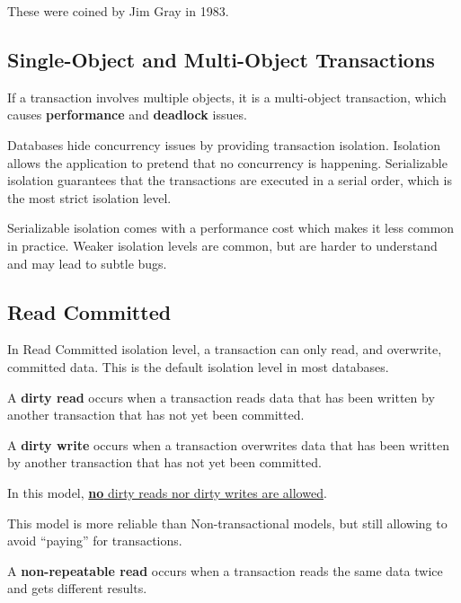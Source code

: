 These were coined by Jim Gray in 1983.

\subsection{Single-Object and Multi-Object Transactions}
If a transaction involves multiple objects, it is a multi-object transaction, which causes \textbf{performance} and \textbf{deadlock} issues.


Databases hide concurrency issues by providing transaction isolation.
Isolation allows the application to pretend that no concurrency is happening.
Serializable isolation guarantees that the transactions are executed in a serial order, which is the most strict isolation level.

Serializable isolation comes with a performance cost which makes it less common in practice.
Weaker isolation levels are common, but are harder to understand and may lead to subtle bugs.

\subsection{Read Committed}
In Read Committed isolation level, a transaction can only read, and overwrite, committed data.
This is the default isolation level in most databases.

\begin{definition}
   A \textbf{dirty read} occurs when a transaction reads data that has been written by another transaction that has not yet been committed.
\end{definition}


\begin{definition}
   A \textbf{dirty write} occurs when a transaction overwrites data that has been written by another transaction that has not yet been committed.
\end{definition}

In this model, \ul{\textbf{no} dirty reads nor dirty writes are allowed}.

This model is more reliable than Non-transactional models, but still allowing to avoid ``paying'' for transactions.

\begin{definition}
   A \textbf{non-repeatable read} occurs when a transaction reads the same data twice and gets different results.
\end{definition}

